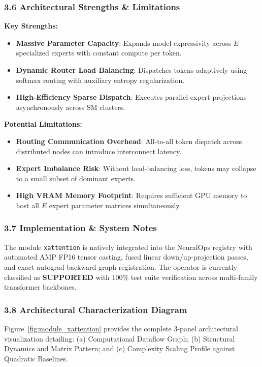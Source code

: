 \subsubsection*{3.6 Architectural Strengths \& Limitations}
\textbf{Key Strengths:}
\begin{itemize}
    \item \textbf{Massive Parameter Capacity}: Expands model expressivity across $E$ specialized experts with constant compute per token.
    \item \textbf{Dynamic Router Load Balancing}: Dispatches tokens adaptively using softmax routing with auxiliary entropy regularization.
    \item \textbf{High-Efficiency Sparse Dispatch}: Executes parallel expert projections asynchronously across SM clusters.
\end{itemize}

\textbf{Potential Limitations:}
\begin{itemize}
    \item \textbf{Routing Communication Overhead}: All-to-all token dispatch across distributed nodes can introduce interconnect latency.
    \item \textbf{Expert Imbalance Risk}: Without load-balancing loss, tokens may collapse to a small subset of dominant experts.
    \item \textbf{High VRAM Memory Footprint}: Requires sufficient GPU memory to host all $E$ expert parameter matrices simultaneously.
\end{itemize}

\subsubsection*{3.7 Implementation \& System Notes}
The module \texttt{xattention} is natively integrated into the NeuralOps registry with automated AMP FP16 tensor casting, fused linear down/up-projection passes, and exact autograd backward graph registration. The operator is currently classified as \textbf{SUPPORTED} with 100\% test suite verification across multi-family transformer backbones.

\subsubsection*{3.8 Architectural Characterization Diagram}
Figure~\ref{fig:module_xattention} provides the complete 3-panel architectural visualization detailing: (a) Computational Dataflow Graph; (b) Structural Dynamics and Matrix Pattern; and (c) Complexity Scaling Profile against Quadratic Baselines.

